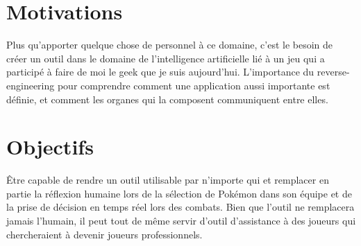 \documentclass[12pt, twoside, openright]{report}
\begin{document}
\leavevmode\thispagestyle{empty}\newpage


\section*{Motivations}

Plus qu'apporter quelque chose de personnel à ce domaine, c'est le besoin de créer un outil dans le domaine de l'intelligence artificielle lié à un jeu qui a participé à faire de moi le geek que je suis aujourd'hui. L'importance du reverse-engineering pour comprendre comment une application aussi importante est définie, et comment les organes qui la composent communiquent entre elles.

\section*{Objectifs}

Être capable de rendre un outil utilisable par n'importe qui et remplacer en partie la réflexion humaine lors de la sélection de Pokémon dans son équipe et de la prise de décision en temps réel lors des combats. Bien que l'outil ne remplacera jamais l'humain, il peut tout de même servir d'outil d'assistance à des joueurs qui chercheraient à devenir joueurs professionnels.

\leavevmode\thispagestyle{empty}\newpage










\end{document}
